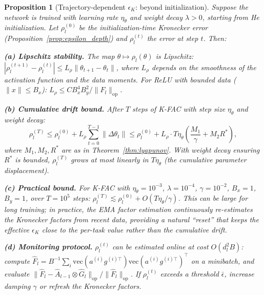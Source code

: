 \documentclass{article}
\providecommand{\norm}[1]{\lVert #1 \rVert}
\theoremstyle{plain}
\newtheorem{proposition}{Proposition}
\theoremstyle{definition}
\theoremstyle{remark}
\begin{document}
\begin{proposition}[Trajectory-dependent $\epsilon_K$: beyond initialization]
\label{prop:epsilon_trajectory}
Suppose the network is trained with learning rate $\eta_\theta$ and weight decay $\lambda > 0$, starting from He initialization. Let $\rho_l^{(0)}$ be the initialization-time Kronecker error (Proposition~\ref{prop:epsilon_depth}) and $\rho_l^{(t)}$ the error at step $t$. Then:

\textbf{(a) Lipschitz stability.} The map $\theta \mapsto \rho_l(\theta)$ is Lipschitz: $|\rho_l^{(t+1)} - \rho_l^{(t)}| \leq L_\rho \norm{\theta_{t+1} - \theta_t}$, where $L_\rho$ depends on the smoothness of the activation function and the data moments. For ReLU with bounded data ($\norm{x} \leq B_x$): $L_\rho \leq C B_x^4 B_y^2 / \norm{F_l}_{\mathrm{op}}$.

\textbf{(b) Cumulative drift bound.} After $T$ steps of K-FAC with step size $\eta_\theta$ and weight decay:
\begin{equation}
    \rho_l^{(T)} \leq \rho_l^{(0)} + L_\rho \sum_{t=0}^{T-1}\norm{\Delta\theta_t} \leq \rho_l^{(0)} + L_\rho \cdot T \eta_\theta \left(\frac{M_1}{\gamma} + M_2 R^*\right),
\end{equation}
where $M_1, M_2, R^*$ are as in Theorem~\ref{thm:lyapunov}. With weight decay ensuring $R^*$ is bounded, $\rho_l^{(T)}$ grows at most \emph{linearly} in $T\eta_\theta$ (the cumulative parameter displacement).

\textbf{(c) Practical bound.} For K-FAC with $\eta_\theta = 10^{-3}$, $\lambda = 10^{-4}$, $\gamma = 10^{-2}$, $B_x = 1$, $B_y = 1$, over $T = 10^5$ steps: $\rho_l^{(T)} \lesssim \rho_l^{(0)} + O(T\eta_\theta/\gamma)$. This can be large for long training; in practice, the EMA factor estimation continuously re-estimates the Kronecker factors from recent data, providing a natural ``reset'' that keeps the \emph{effective} $\epsilon_K$ close to the per-task value rather than the cumulative drift.

\textbf{(d) Monitoring protocol.} $\rho_l^{(t)}$ can be estimated online at cost $O(d_l^2 B)$: compute $\hat{F}_l = B^{-1}\sum_i \mathrm{vec}(a^{(i)}g^{(i)\top})\mathrm{vec}(a^{(i)}g^{(i)\top})^\top$ on a minibatch, and evaluate $\norm{\hat{F}_l - \hat{A}_{l-1} \otimes \hat{G}_l}_{\mathrm{op}}/\norm{\hat{F}_l}_{\mathrm{op}}$. If $\rho_l^{(t)}$ exceeds a threshold $\bar{\epsilon}$, increase damping $\gamma$ or refresh the Kronecker factors.
\end{proposition}
\end{document}
